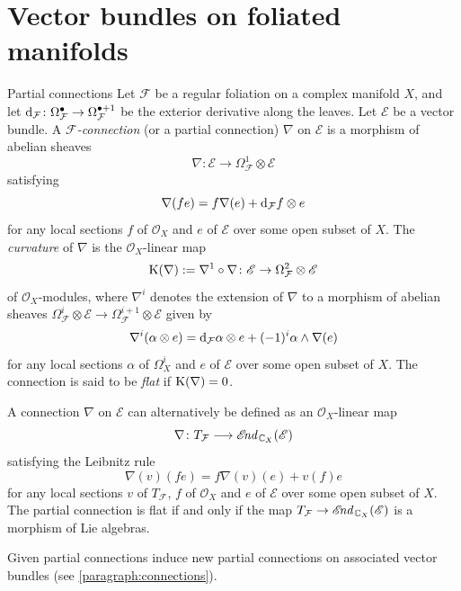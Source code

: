 \documentclass[english,10pt]{amsart}
\makeatletter
\renewcommand\subsection{\@startsection{subsection}{2}%
  \z@{.5\linespacing\@plus.7\linespacing}{-.5em}%
  {\normalfont\sffamily}}
\newcommand{\cF}{\mathcal{F}}
\newcommand{\sE}{\mathscr{E}}
\newcommand{\sO}{\mathscr{O}}
\newcommand{\dd}{\textup{d}}
\theoremstyle{definition}
\theoremstyle{remark}
\numberwithin{equation}{section}
\makeatother
\begin{document}
\section{Vector bundles on foliated manifolds}\label{section:connections_foliated_bundles}

\subsection{Partial connections}\label{paragraph:partial_connections}
Let $\cF$ be a regular foliation on a complex manifold $X$, and let $\dd_\cF \colon \Omega^{\bullet}_\cF \to \Omega^{\bullet + 1}_\cF$ be the exterior derivative along the leaves. Let $\sE$ be a vector bundle. A \textit{$\cF$-connection} (or a partial connection) $\nabla$ on $\sE$ is a morphism of abelian sheaves
\[
\nabla\colon \sE \to \Omega_\cF^1\otimes\sE
\] 
satisfying 
\[
\nabla(fe)=f\nabla(e)+\dd_\cF f \otimes e
\] 
for any local sections $f$ of $\sO_X$ and $e$ of $\sE$ over some open subset of $X$. The \emph{curvature} of $\nabla$ is the $\sO_X$-linear map
\[
\textup{K}(\nabla):=\nabla^1\circ\nabla\colon \sE \to \Omega_\cF^2\otimes \sE
\]
of $\sO_X$-modules, where $\nabla^i$ denotes the extension of $\nabla$ to 
a morphism of abelian sheaves $\Omega_\cF^i \otimes \sE \to \Omega_\cF^{i+1} \otimes \sE$ given by 
\[
\nabla^i(\alpha\otimes e)= \dd_\cF \alpha \otimes e + (-1)^i \alpha \wedge \nabla(e)
\]
for any local sections $\alpha$ of $\Omega_X^i$ and $e$ of $\sE$ over some open subset of $X$. 
The connection is said to be \textit{flat} if $\textup{K}(\nabla)=0$.

A connection $\nabla$ on $\sE$ can alternatively be defined as an $\sO_X$-linear map
\[
\nabla \colon T_\cF \longrightarrow  \sE\hspace{-0.07cm}\textit{nd}_{\,\mathbb{C}_X}(\sE)
\]
satisfying the Leibnitz rule 
\[
\nabla (v) (fe)=f\nabla (v) (e)+v(f) e
\] 
for any local sections $v$ of $T_\cF$, $f$ of $\sO_X$ and $e$ of $\sE$ over some open subset of $X$. 
The partial connection is flat if and only if the map $T_\cF \to \sE\hspace{-0.07cm}\textit{nd}_{\,\mathbb{C}_X}(\sE)$ is a morphism of Lie algebras. 

\medskip

Given partial connections induce new partial connections on associated vector bundles (see \ref{paragraph:connections}).

\medskip
\end{document}
